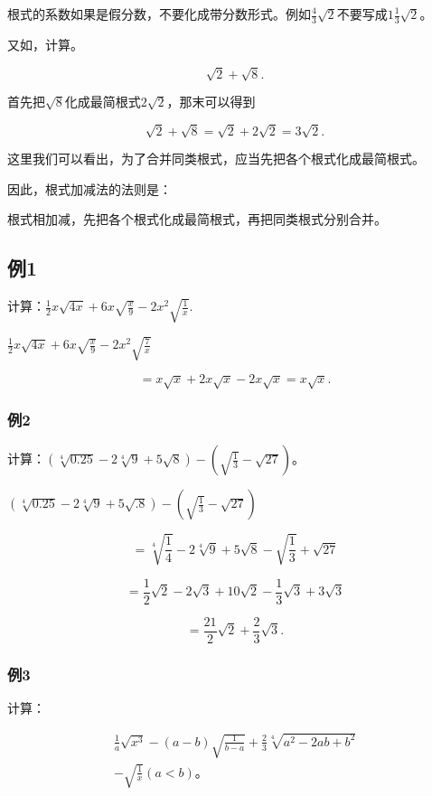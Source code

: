 根式的系数如果是假分数，不要化成带分数形式。例如\(\frac{4}{3}\sqrt{2}\)不要写成\(1\frac{1}{3}\sqrt{2}\)。

又如，计算。

\[
\sqrt {2} + \sqrt {8}.
\]

首先把\(\sqrt{8}\)化成最简根式\(2\sqrt{2}\)，那末可以得到

\[
\sqrt {2} + \sqrt {8} = \sqrt {2} + 2 \sqrt {2} = 3 \sqrt {2}.
\]

这里我们可以看出，为了合并同类根式，应当先把各个根式化成最简根式。

因此，根式加减法的法则是：

根式相加减，先把各个根式化成最简根式，再把同类根式分别合并。

\subsection{例1}

计算：\(\frac{1}{2} x\sqrt{4x} + 6x\sqrt{\frac{x}{9}} - 2x^2\sqrt{\frac{1}{x}}.\)

\(\frac{1}{2} x\sqrt{4x} + 6x\sqrt{\frac{x}{9}} - 2x^2\sqrt{\frac{7}{x}}\)

\[
= x \sqrt {x} + 2 x \sqrt {x} - 2 x \sqrt {x} = x \sqrt {x}.
\]

\subsubsection{例2}

计算：\((\sqrt[4]{0.25} - 2\sqrt[4]{9} + 5\sqrt{8}) - \left(\sqrt{\frac{1}{3}} - \sqrt{27}\right)\)。

\((\sqrt[4]{0.25} - 2\sqrt[4]{9} + 5\sqrt{.8}) - \left(\sqrt{\frac{1}{3}} - \sqrt{27}\right)\)

\[
= \sqrt[4]{\frac{1}{4}} - 2 \sqrt[4]{9} + 5 \sqrt {8} - \sqrt {\frac{1}{3}} + \sqrt {27}
\]

\[
= \frac{1}{2} \sqrt {2} - 2 \sqrt {3} + 10 \sqrt {2} - \frac{1}{3} \sqrt {3} + 3 \sqrt {3}
\]

\[
= \frac{21}{2} \sqrt {2} + \frac{2}{3} \sqrt {3}.
\]

\subsubsection{例3}

计算：

\[
\begin{array}{l} \frac{1}{a} \sqrt {x ^ {3}} - (a - b) \sqrt {\frac{1}{b - a}} + \frac{2}{3} \sqrt[4]{a ^ {2} - 2 a b + b ^ {2}} \\ - \sqrt {\frac{1}{x}} (a <   b)\text{。} \\ \end{array}
\]

